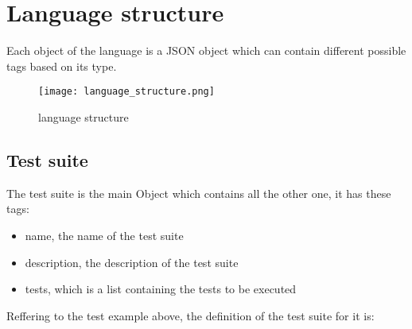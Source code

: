 

\section{Language structure}
Each object of the language is a JSON object which can contain different possible tags based on its type.
\begin{figure}
    \texttt{[image: language\_structure.png]}
    \caption{language structure}
    \label{fig:language_structure}
\end{figure}


\subsection{Test suite}
The test suite is the main Object which contains all the other one, it has these tags:
\begin{itemize}
    \item name, the name of the test suite
    \item description, the description of the test suite
    \item tests, which is a list containing the tests to be executed
\end{itemize}
Reffering to the test example above, the definition of the test suite for it is:

